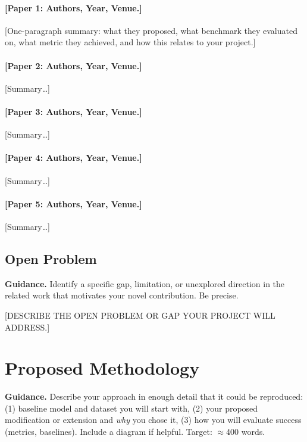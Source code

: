 \documentclass[11pt, letterpaper]{article}
\begin{document}
\paragraph{[Paper 1: Authors, Year, Venue.]}
[One-paragraph summary: what they proposed, what benchmark they evaluated on,
what metric they achieved, and how this relates to your project.]

\paragraph{[Paper 2: Authors, Year, Venue.]}
[Summary\ldots]

\paragraph{[Paper 3: Authors, Year, Venue.]}
[Summary\ldots]

\paragraph{[Paper 4: Authors, Year, Venue.]}
[Summary\ldots]

\paragraph{[Paper 5: Authors, Year, Venue.]}
[Summary\ldots]

\subsection{Open Problem}

\begin{guidancebox}
\textbf{Guidance.} Identify a specific gap, limitation, or unexplored direction
in the related work that motivates your novel contribution. Be precise.
\end{guidancebox}

[DESCRIBE THE OPEN PROBLEM OR GAP YOUR PROJECT WILL ADDRESS.]

\section{Proposed Methodology}

\begin{guidancebox}
\textbf{Guidance.}
Describe your approach in enough detail that it could be reproduced:
(1) baseline model and dataset you will start with,
(2) your proposed modification or extension and \emph{why} you chose it,
(3) how you will evaluate success (metrics, baselines).
Include a diagram if helpful. Target: $\approx$400 words.
\end{guidancebox}
\end{document}
